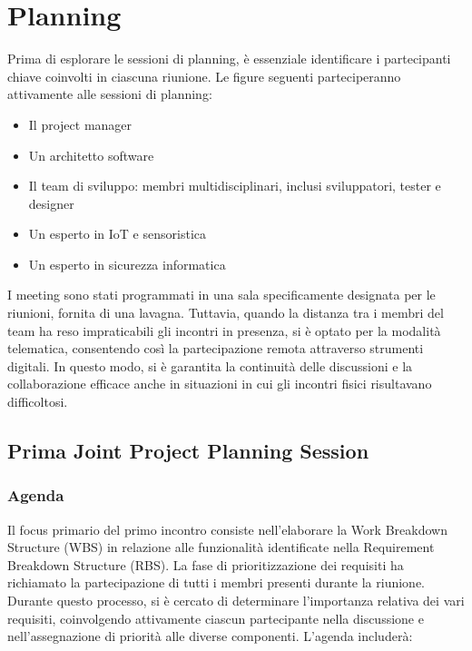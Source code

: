 \chapter{Planning}

Prima di esplorare le sessioni di planning, è essenziale identificare i partecipanti chiave coinvolti in ciascuna riunione. Le figure seguenti parteciperanno attivamente alle sessioni di planning:

\begin{itemize}
    \item Il project manager
    \item Un architetto software
    \item Il team di sviluppo: membri multidisciplinari, inclusi sviluppatori, tester e designer
    \item Un esperto in IoT e sensoristica
    \item Un esperto in sicurezza informatica
\end{itemize}

I meeting sono stati programmati in una sala specificamente designata per le riunioni, fornita di una lavagna. Tuttavia, quando la distanza tra i membri del team ha reso impraticabili gli incontri in presenza, si è optato per la modalità telematica, consentendo così la partecipazione remota attraverso strumenti digitali. In questo modo, si è garantita la continuità delle discussioni e la collaborazione efficace anche in situazioni in cui gli incontri fisici risultavano difficoltosi.

\section{Prima Joint Project Planning Session}

\subsection{Agenda}

Il focus primario del primo incontro consiste nell'elaborare la Work Breakdown Structure (WBS) in relazione alle funzionalità identificate nella Requirement Breakdown Structure (RBS). La fase di prioritizzazione dei requisiti ha richiamato la partecipazione di tutti i membri presenti durante la riunione. Durante questo processo, si è cercato di determinare l'importanza relativa dei vari requisiti, coinvolgendo attivamente ciascun partecipante nella discussione e nell'assegnazione di priorità alle diverse componenti. L'agenda includerà:

